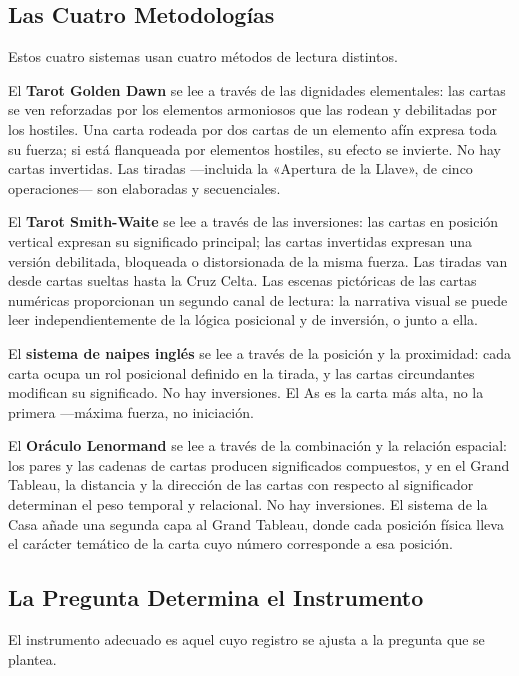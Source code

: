 \subsection{Las Cuatro Metodologías}\label{the-four-methodologies}

Estos cuatro sistemas usan cuatro métodos de lectura distintos.

El \textbf{Tarot Golden Dawn} se lee a través de las dignidades elementales: las cartas se ven reforzadas por los elementos armoniosos que las rodean y debilitadas por los hostiles. Una carta rodeada por dos cartas de un elemento afín expresa toda su fuerza; si está flanqueada por elementos hostiles, su efecto se invierte. No hay cartas invertidas. Las tiradas ---incluida la «Apertura de la Llave», de cinco operaciones--- son elaboradas y secuenciales.

El \textbf{Tarot Smith-Waite} se lee a través de las inversiones: las cartas en posición vertical expresan su significado principal; las cartas invertidas expresan una versión debilitada, bloqueada o distorsionada de la misma fuerza. Las tiradas van desde cartas sueltas hasta la Cruz Celta. Las escenas pictóricas de las cartas numéricas proporcionan un segundo canal de lectura: la narrativa visual se puede leer independientemente de la lógica posicional y de inversión, o junto a ella.

El \textbf{sistema de naipes inglés} se lee a través de la posición y la proximidad: cada carta ocupa un rol posicional definido en la tirada, y las cartas circundantes modifican su significado. No hay inversiones. El As es la carta más alta, no la primera ---máxima fuerza, no iniciación.

El \textbf{Oráculo Lenormand} se lee a través de la combinación y la relación espacial: los pares y las cadenas de cartas producen significados compuestos, y en el Grand Tableau, la distancia y la dirección de las cartas con respecto al significador determinan el peso temporal y relacional. No hay inversiones. El sistema de la Casa añade una segunda capa al Grand Tableau, donde cada posición física lleva el carácter temático de la carta cuyo número corresponde a esa posición.

\subsection{La Pregunta Determina el Instrumento}\label{the-question-decides-the-instrument}

El instrumento adecuado es aquel cuyo registro se ajusta a la pregunta que se plantea.

